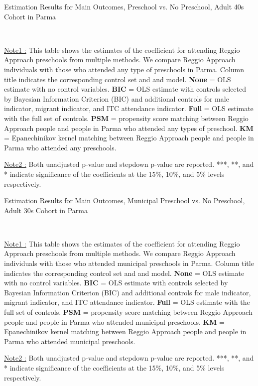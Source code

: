 \begin{table}[H] \caption{Estimation Results for Main Outcomes, Preschool vs. No Preschool, Adult 40s Cohort in Parma} \label{ols-M-adult40-reg-pres-parma}
\scalebox{0.62}{}
\vspace{1ex} \\
\footnotesize\raggedright{\underline{Note1 :} This table shows the estimates of the coefficient for attending Reggio Approach preschools from multiple methods. We compare Reggio Approach individuals with those who attended any type of preschools in Parma. Column title indicates the corresponding control set and and model. \textbf{None} = OLS estimate with no control variables. \textbf{BIC} = OLS estimate with controls selected by Bayesian Information Criterion (BIC) and additional controls for male indicator, migrant indicator, and ITC attendance indicator. \textbf{Full} = OLS estimate with the full set of controls. \textbf{PSM} =  propensity score matching between Reggio Approach people and people in Parma who attended any types of preschool. \textbf{KM} = Epanechinikov kernel matching between Reggio Approach people and people in Parma who attended any preschools.}

\footnotesize\raggedright{\underline{Note2 :} Both unadjusted p-value and stepdown p-value are reported. ***, **, and * indicate significance of the coefficients at the 15\%, 10\%, and 5\% levels respectively.}

\end{table}




\begin{table}[H] \caption{Estimation Results for Main Outcomes, Municipal Preschool vs. No Preschool, Adult 30s Cohort in Parma} \label{ols-M-adult30-reg-muni-parma}
\scalebox{0.62}{}
\vspace{1ex} \\
\footnotesize\raggedright{\underline{Note1 :} This table shows the estimates of the coefficient for attending Reggio Approach preschools from multiple methods. We compare Reggio Approach individuals with those who attended municipal preschools in Parma. Column title indicates the corresponding control set and and model. \textbf{None} = OLS estimate with no control variables. \textbf{BIC} = OLS estimate with controls selected by Bayesian Information Criterion (BIC) and additional controls for male indicator, migrant indicator, and ITC attendance indicator. \textbf{Full} = OLS estimate with the full set of controls. \textbf{PSM} =  propensity score matching between Reggio Approach people and people in Parma who attended municipal preschools. \textbf{KM} = Epanechinikov kernel matching between Reggio Approach people and people in Parma who attended municipal preschools.}

\footnotesize\raggedright{\underline{Note2 :} Both unadjusted p-value and stepdown p-value are reported. ***, **, and * indicate significance of the coefficients at the 15\%, 10\%, and 5\% levels respectively.}
\end{table}






